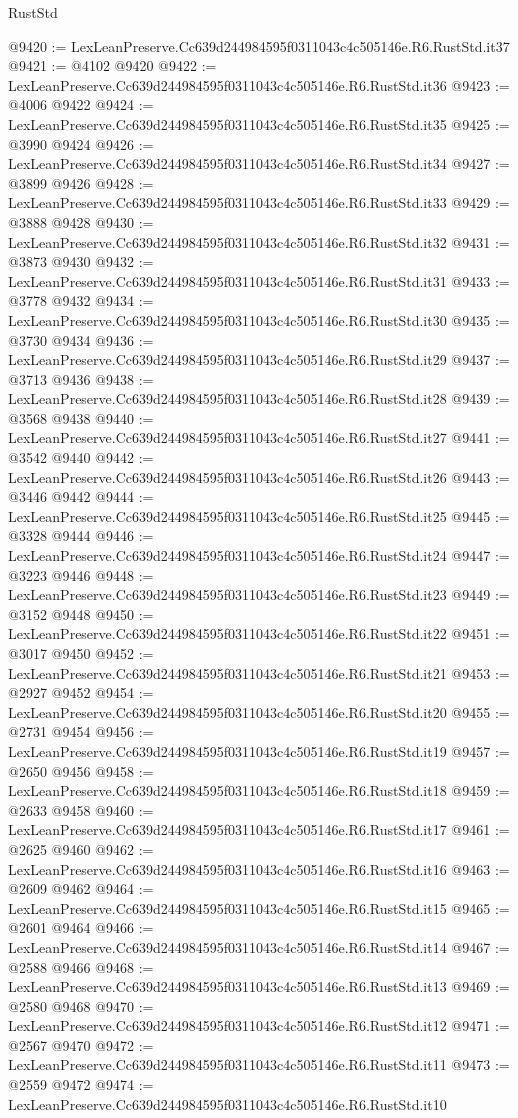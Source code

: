 \begin{lexlean}{RustStd}
\begin{coremodule}
@9420 := LexLeanPreserve.Cc639d244984595f0311043c4c505146e.R6.RustStd.it37
@9421 := @4102 @9420
@9422 := LexLeanPreserve.Cc639d244984595f0311043c4c505146e.R6.RustStd.it36
@9423 := @4006 @9422
@9424 := LexLeanPreserve.Cc639d244984595f0311043c4c505146e.R6.RustStd.it35
@9425 := @3990 @9424
@9426 := LexLeanPreserve.Cc639d244984595f0311043c4c505146e.R6.RustStd.it34
@9427 := @3899 @9426
@9428 := LexLeanPreserve.Cc639d244984595f0311043c4c505146e.R6.RustStd.it33
@9429 := @3888 @9428
@9430 := LexLeanPreserve.Cc639d244984595f0311043c4c505146e.R6.RustStd.it32
@9431 := @3873 @9430
@9432 := LexLeanPreserve.Cc639d244984595f0311043c4c505146e.R6.RustStd.it31
@9433 := @3778 @9432
@9434 := LexLeanPreserve.Cc639d244984595f0311043c4c505146e.R6.RustStd.it30
@9435 := @3730 @9434
@9436 := LexLeanPreserve.Cc639d244984595f0311043c4c505146e.R6.RustStd.it29
@9437 := @3713 @9436
@9438 := LexLeanPreserve.Cc639d244984595f0311043c4c505146e.R6.RustStd.it28
@9439 := @3568 @9438
@9440 := LexLeanPreserve.Cc639d244984595f0311043c4c505146e.R6.RustStd.it27
@9441 := @3542 @9440
@9442 := LexLeanPreserve.Cc639d244984595f0311043c4c505146e.R6.RustStd.it26
@9443 := @3446 @9442
@9444 := LexLeanPreserve.Cc639d244984595f0311043c4c505146e.R6.RustStd.it25
@9445 := @3328 @9444
@9446 := LexLeanPreserve.Cc639d244984595f0311043c4c505146e.R6.RustStd.it24
@9447 := @3223 @9446
@9448 := LexLeanPreserve.Cc639d244984595f0311043c4c505146e.R6.RustStd.it23
@9449 := @3152 @9448
@9450 := LexLeanPreserve.Cc639d244984595f0311043c4c505146e.R6.RustStd.it22
@9451 := @3017 @9450
@9452 := LexLeanPreserve.Cc639d244984595f0311043c4c505146e.R6.RustStd.it21
@9453 := @2927 @9452
@9454 := LexLeanPreserve.Cc639d244984595f0311043c4c505146e.R6.RustStd.it20
@9455 := @2731 @9454
@9456 := LexLeanPreserve.Cc639d244984595f0311043c4c505146e.R6.RustStd.it19
@9457 := @2650 @9456
@9458 := LexLeanPreserve.Cc639d244984595f0311043c4c505146e.R6.RustStd.it18
@9459 := @2633 @9458
@9460 := LexLeanPreserve.Cc639d244984595f0311043c4c505146e.R6.RustStd.it17
@9461 := @2625 @9460
@9462 := LexLeanPreserve.Cc639d244984595f0311043c4c505146e.R6.RustStd.it16
@9463 := @2609 @9462
@9464 := LexLeanPreserve.Cc639d244984595f0311043c4c505146e.R6.RustStd.it15
@9465 := @2601 @9464
@9466 := LexLeanPreserve.Cc639d244984595f0311043c4c505146e.R6.RustStd.it14
@9467 := @2588 @9466
@9468 := LexLeanPreserve.Cc639d244984595f0311043c4c505146e.R6.RustStd.it13
@9469 := @2580 @9468
@9470 := LexLeanPreserve.Cc639d244984595f0311043c4c505146e.R6.RustStd.it12
@9471 := @2567 @9470
@9472 := LexLeanPreserve.Cc639d244984595f0311043c4c505146e.R6.RustStd.it11
@9473 := @2559 @9472
@9474 := LexLeanPreserve.Cc639d244984595f0311043c4c505146e.R6.RustStd.it10

\end{coremodule}
\end{lexlean}
